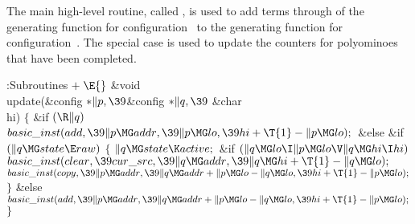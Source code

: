 The main high-level routine, called , is used to add terms
 through  of the generating function for
configuration~
to the generating function for configuration~. The special case
 is used to update the counters for polyominoes that have been
completed.

\Y\B\4:Subroutines\X${}\mathrel+\E{}$\6
\&{void} \\{update}(\&{config} ${}{*}\|p,\39{}$\&{config} ${}{*}\|q,\39{}$%
\&{char} \\{hi})\1\1\2\2\6
${}\{{}$\1\6
\&{if} ${}(\R\|q){}$\1\5
${}\\{basic\_inst}(\\{add},\39\|p\MG\\{addr},\39\|p\MG\\{lo},\39\\{hi}+\T{1}-%
\|p\MG\\{lo});{}$\2\6
\&{else} \&{if} ${}(\|q\MG\\{state}\E\\{raw}){}$\5
${}\{{}$\1\6
${}\|q\MG\\{state}\K\\{active};{}$\6
\&{if} ${}(\|q\MG\\{lo}\I\|p\MG\\{lo}\V\|q\MG\\{hi}\I\\{hi}){}$\1\5
${}\\{basic\_inst}(\\{clear},\39\\{cur\_src},\39\|q\MG\\{addr},\39\|q\MG\\{hi}+%
\T{1}-\|q\MG\\{lo});{}$\2\6
${}\\{basic\_inst}(\\{copy},\39\|p\MG\\{addr},\39\|q\MG\\{addr}+\|p\MG\\{lo}-%
\|q\MG\\{lo},\39\\{hi}+\T{1}-\|p\MG\\{lo});{}$\6
\4${}\}{}$\5
\2\&{else}\1\5
${}\\{basic\_inst}(\\{add},\39\|p\MG\\{addr},\39\|q\MG\\{addr}+\|p\MG\\{lo}-\|q%
\MG\\{lo},\39\\{hi}+\T{1}-\|p\MG\\{lo});{}$\2\6
\4${}\}{}$\2\par
\fi

